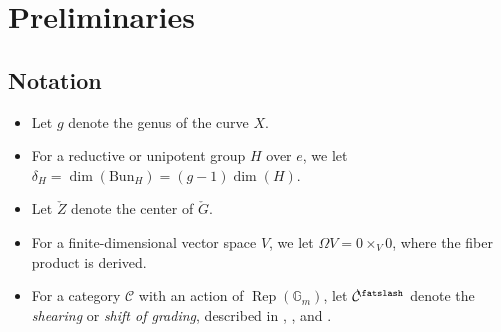 \documentclass[11pt]{amsart}
\newcommand{\shear}{{\mathbin{\mkern-6mu\fatslash}}}
\newcommand{\bG}{\mathbb{G}}
\newcommand{\Rep}{\operatorname{Rep}}
\newcommand{\Bun}{{\mathrm{Bun}}}
\theoremstyle{remark}
\theoremstyle{definition}
\begin{document}
\section{Preliminaries}\label{sec:preliminaries}

\subsection{Notation} 
\begin{itemize}
    \item Let $g$ denote the genus of the curve $X$.
    \item For a reductive or unipotent group $H$ over $e$, we let $\delta_H=\dim(\Bun_H)=(g-1)\dim(H)$. 
    \item Let $\check Z$ denote the center of $\check G$.
\item For a finite-dimensional vector space $V$, we let $\Omega V=0\times_V0$, where the fiber product is derived.
\item For a category $\mathcal C$ with an action of $\Rep(\bG_m)$, let $\mathcal C^\shear$ denote the \emph{shearing} or \emph{shift of grading}, described in \cite[\S A.2]{singular-support}, \cite[\S2.1]{spectral-gluing}, and \cite[Definition~6.3.2]{relative-langlands}. 
\end{itemize} 
\end{document}
